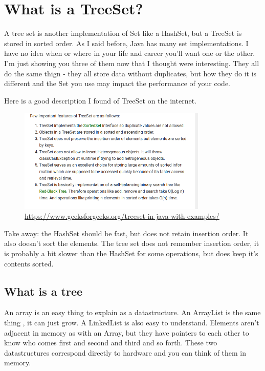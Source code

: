 \documentclass[12pt]{article}
\begin{document}
\section{What is a TreeSet?}
A tree set is another implementation of Set like a HashSet, but a TreeSet is stored in sorted order. As I said before, Java has many set implementations. I have no idea when or where in your life and career you'll want one or the other. I'm just showing you three of them now that I thought were interesting. They all do the same thign - they all store data without duplicates, but how they do it is different and the Set you use may impact the performance of your code.

Here is a good description I found of TreeSet on the internet.

\begin{figure}[h]
  \centering
    \includegraphics[width=0.8\textwidth]{Images/treeSet.png}
  \caption{\url{https://www.geeksforgeeks.org/treeset-in-java-with-examples/}}
\end{figure}

Take away: the HashSet should be fast, but does not retain insertion order. It also doesn't sort the elements. The tree set does not remember insertion order, it is probably a bit slower than the HashSet for some operations, but does keep it's contents sorted.

\subsection{What is a tree}
An array is an easy thing to explain as a datastructure. An ArrayList is the same thing , it can just grow. A LinkedList is also easy to understand. Elements aren't adjacent in memory as with an Array, but they have pointers to each other to know who comes first and second and third and so forth. These two datastructures correspond directly to hardware and you can think of them in memory. 
\end{document}
